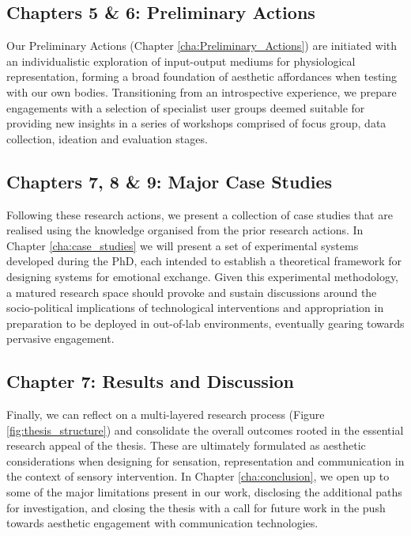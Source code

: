 \subsection*{Chapters 5 \& 6: Preliminary Actions}

Our Preliminary Actions (Chapter \ref{cha:Preliminary_Actions}) are initiated with an individualistic exploration of input-output mediums for physiological representation, forming a broad foundation of aesthetic affordances when testing with our own bodies. Transitioning from an introspective experience, we prepare engagements with a selection of specialist user groups deemed suitable for providing new insights in a series of workshops comprised of focus group, data collection, ideation and evaluation stages.

\subsection*{Chapters 7, 8 \& 9: Major Case Studies}

Following these research actions, we present a collection of case studies that are realised using the knowledge organised from the prior research actions. In Chapter \ref{cha:case_studies} we will present a set of experimental systems developed during the PhD, each intended to establish a theoretical framework for designing systems for emotional exchange. Given this experimental methodology, a matured research space should provoke and sustain discussions around the socio-political implications of technological interventions and appropriation in preparation to be deployed in out-of-lab environments, eventually gearing towards pervasive engagement.

\subsection*{Chapter 7: Results and Discussion}

Finally, we can reflect on a multi-layered research process (Figure \ref{fig:thesis_structure}) and consolidate the overall outcomes rooted in the essential research appeal of the thesis. These are ultimately formulated as aesthetic considerations when designing for sensation, representation and communication in the context of sensory intervention. In Chapter \ref{cha:conclusion}, we open up to some of the major limitations present in our work, disclosing the additional paths for investigation, and closing the thesis with a call for future work in the push towards aesthetic engagement with communication technologies.

